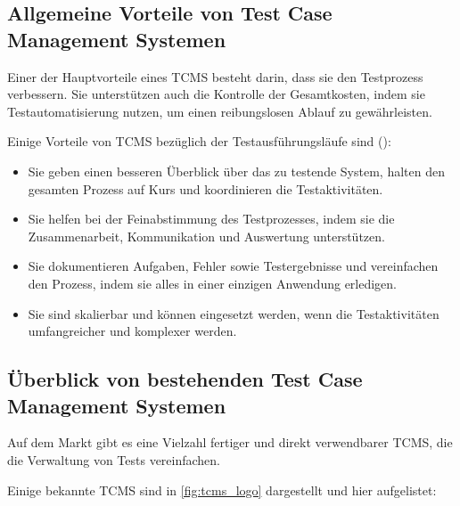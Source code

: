 \documentclass[a4paper, fontsize=11pt, parskip=half, twoside, headings=openright]{scrreprt}
\begin{document}
	
	\subsection{Allgemeine Vorteile von Test Case Management Systemen}
	Einer der Hauptvorteile eines \ac{TCMS} besteht darin, dass sie den Testprozess verbessern. 
	Sie unterstützen auch die Kontrolle der Gesamtkosten, indem sie Testautomatisierung nutzen, um einen reibungslosen Ablauf zu gewährleisten.  
	
	Einige Vorteile von \ac{TCMS} bezüglich der Testausführungsläufe sind (\textcite{lead_articles_nodate}):
	
	\begin{itemize}
		\item Sie geben einen besseren Überblick über das zu testende System, halten den gesamten Prozess auf Kurs und koordinieren die Testaktivitäten.
		\item Sie helfen bei der Feinabstimmung des Testprozesses, indem sie die Zusammenarbeit, Kommunikation und Auswertung unterstützen.
		\item Sie dokumentieren Aufgaben, Fehler sowie Testergebnisse und vereinfachen den Prozess, indem sie alles in einer einzigen Anwendung erledigen.
		\item Sie sind skalierbar und können eingesetzt werden, wenn die Testaktivitäten umfangreicher und komplexer werden.
	\end{itemize}
	
	
	\subsection{Überblick von bestehenden Test Case Management Systemen}
	Auf dem Markt gibt es eine Vielzahl fertiger und direkt verwendbarer \ac{TCMS}, die die Verwaltung von Tests vereinfachen.
	
	Einige bekannte \ac{TCMS} sind in \autoref{fig:tcms_logo} dargestellt und hier aufgelistet:
	
\end{document}
